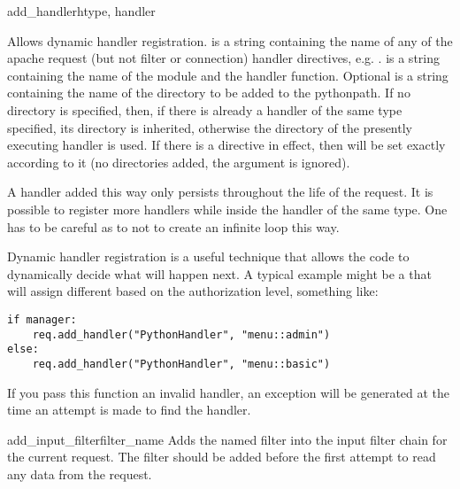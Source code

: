 \begin{methoddesc}[request]{add_handler}{htype, handler}

  Allows dynamic handler registration.  is a string
  containing the name of any of the apache request (but not filter or
  connection) handler directives,
  e.g. .  is a string containing the
  name of the module and the handler function.  Optional  is
  a string containing the name of the directory to be added to the
  pythonpath. If no directory is specified, then, if there is already
  a handler of the same type specified, its directory is inherited,
  otherwise the directory of the presently executing handler is
  used. If there is a  directive in effect, then
   will be set exactly according to it (no directories
  added, the  argument is ignored).
  
  A handler added this way only persists throughout the life of the
  request. It is possible to register more handlers while inside the
  handler of the same type. One has to be careful as to not to create
  an infinite loop this way.

  Dynamic handler registration is a useful technique that allows the
  code to dynamically decide what will happen next. A typical example
  might be a  that will assign different
   based on the authorization level, something
  like:

  \begin{verbatim}
if manager:
    req.add_handler("PythonHandler", "menu::admin")
else:
    req.add_handler("PythonHandler", "menu::basic")
  \end{verbatim}                              

  \begin{notice}
    If you pass this function an invalid handler, an exception will be
    generated at the time an attempt is made to find the handler. 
  \end{notice}

\end{methoddesc}

\begin{methoddesc}[request]{add_input_filter}{filter_name}
  Adds the named filter into the input filter chain for the current request.
  The filter should be added before the first attempt to read any data from
  the request.
\end{methoddesc}

